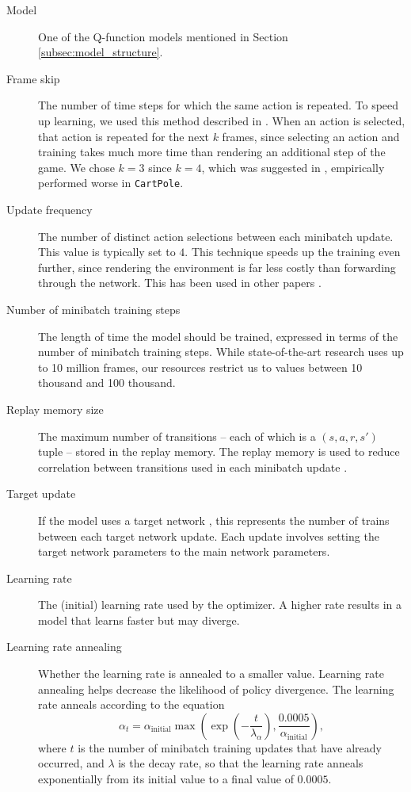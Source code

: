 \documentclass[11pt]{article}
\newcommand{\cp}{\texttt{CartPole}}
\begin{document}
\begin{description}
    \item[Model] One of the Q-function models mentioned in Section \ref{subsec:model_structure}.
    
    \item[Frame skip] The number of time steps for which the same action is repeated. To speed up learning, we used this method described in \cite{mnih2013playing, mnih2015human}. When an action is selected, that action is repeated for the next $k$ frames, since selecting an action and training takes much more time than rendering an additional step of the game. We chose $k = 3$ since $k = 4$, which was suggested in \cite{mnih2013playing, mnih2015human}, empirically performed worse in \cp. 
    
    \item[Update frequency] The number of distinct action selections between each minibatch update. This value is typically set to $4$. This technique speeds up the training even further, since rendering the environment is far less costly than forwarding through the network. This has been used in other papers \cite{mnih2013playing, mnih2015human, van2016deep}.
    
    \item[Number of minibatch training steps] The length of time the model should be trained, expressed in terms of the number of minibatch training steps. While state-of-the-art research uses up to 10 million frames, our resources restrict us to values between 10 thousand and 100 thousand.
    
    \item[Replay memory size] The maximum number of transitions -- each of which is a $(s, a, r, s')$ tuple -- stored in the replay memory. The replay memory is used to reduce correlation between transitions used in each minibatch update \cite{mnih2013playing, mnih2015human}.
    
    \item[Target update] If the model uses a target network \cite{mnih2015human}, this represents the number of trains between each target network update. Each update involves setting the target network parameters to the main network parameters.
    
    \item[Learning rate] The (initial) learning rate used by the optimizer. A higher rate results in a model that learns faster but may diverge.
    
    \item[Learning rate annealing] Whether the learning rate is annealed to a smaller value. Learning rate annealing helps decrease the likelihood of policy divergence. The learning rate anneals according to the equation $$\alpha_t = \alpha_\text{initial} \max\left(\exp\left(-\frac{t}{\lambda_\alpha}\right), \frac{0.0005}{\alpha_\text{initial}}\right),$$ where $t$ is the number of minibatch training updates that have already occurred, and $\lambda$ is the decay rate, so that the learning rate anneals exponentially from its initial value to a final value of $0.0005$.
    

\end{description}
\end{document}
